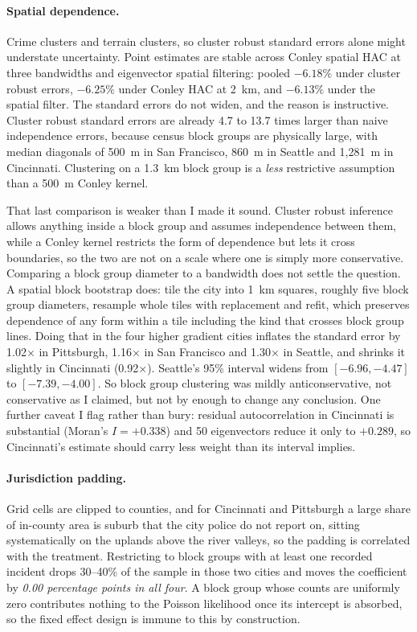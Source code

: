 \documentclass[10pt,letterpaper]{article}
\begin{document}
\paragraph{Spatial dependence.} Crime clusters and terrain clusters, so cluster robust
standard errors alone might understate uncertainty. Point estimates are stable across
Conley spatial HAC \cite{conley1999} at three bandwidths and eigenvector spatial
filtering: pooled
$-6.18\%$ under cluster robust errors, $-6.25\%$ under Conley HAC at 2~km, and
$-6.13\%$ under the spatial filter. The standard errors do not widen, and the reason
is instructive. Cluster robust standard errors are already 4.7 to 13.7 times larger
than naive independence errors, because census block groups are physically large, with
median diagonals of 500~m in San Francisco, 860~m in Seattle and 1,281~m in
Cincinnati. Clustering on a 1.3~km block group is a \emph{less} restrictive assumption
than a 500~m Conley kernel.

That last comparison is weaker than I made it sound. Cluster robust inference allows
anything inside a block group and assumes independence between them, while a Conley
kernel restricts the form of dependence but lets it cross boundaries, so the two are
not on a scale where one is simply more conservative. Comparing a block group diameter
to a bandwidth does not settle the question. A spatial block bootstrap does: tile the
city into 1~km squares, roughly five block group diameters, resample whole tiles with
replacement and refit, which preserves dependence of any form within a tile including
the kind that crosses block group lines. Doing that in the four higher gradient cities
inflates the standard error by 1.02$\times$ in Pittsburgh, 1.16$\times$ in San
Francisco and 1.30$\times$ in Seattle, and shrinks it slightly in Cincinnati
(0.92$\times$). Seattle's 95\% interval widens from $[-6.96, -4.47]$ to
$[-7.39, -4.00]$. So block group clustering was mildly anticonservative, not
conservative as I claimed, but not by enough to change any conclusion. One further
caveat I flag rather than bury:
residual autocorrelation in Cincinnati is substantial (Moran's $I = +0.338$) and 50
eigenvectors reduce it only to $+0.289$, so Cincinnati's estimate should carry less
weight than its interval implies.

\paragraph{Jurisdiction padding.} Grid cells are clipped to counties, and for
Cincinnati and Pittsburgh a large share of in-county area is suburb that the city
police do not report on, sitting systematically on the uplands above the river
valleys, so the padding is correlated with the treatment. Restricting to block groups
with at least one recorded incident drops 30--40\% of the sample in those two cities
and moves the coefficient by \emph{0.00 percentage points in all four}. A block group
whose counts are uniformly zero contributes nothing to the Poisson likelihood once its
intercept is absorbed, so the fixed effect design is immune to this by construction.
\end{document}
